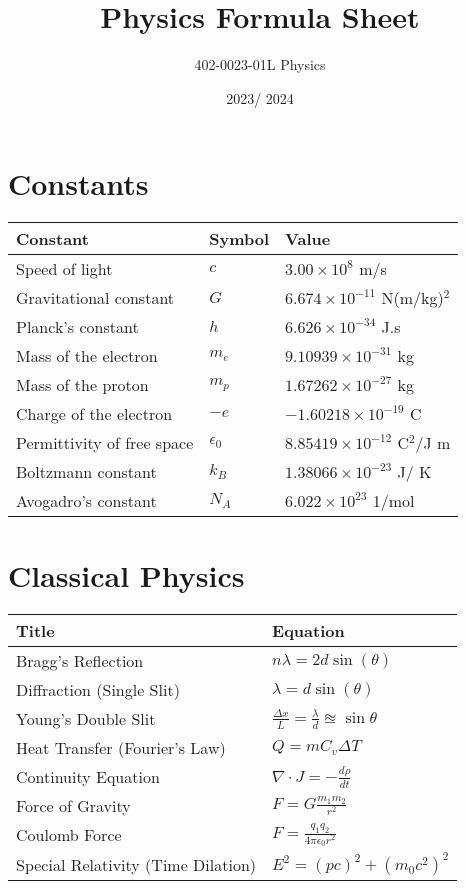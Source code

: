 \documentclass[12pt,a4paper]{article}
\title{Physics Formula Sheet}
\author{402-0023-01L  Physics}
\date{2023/ 2024}
\begin{document}
	\maketitle
	
	\section*{Constants}
	\begin{tabular}{lll}
		\toprule
		Constant & Symbol & Value \\
		\midrule
		Speed of light & \( c \) & \( 3.00 \times 10^8 \) m/s \\
		Gravitational constant & \( G \) & \( 6.674 \times 10^{-11} \) N(m/kg)\(^2\) \\
		Planck's constant & \( h \) & \( 6.626 \times 10^{-34} \) J.s \\
		Mass of the electron & \(m_e\) & \(9.10939 \times 10^{-31}\) kg \\
		Mass of the proton & \(m_p\) & \(1.67262 \times 10^{-27}\) kg \\
		Charge of the electron & \(-e\) & \(-1.60218 \times 10^{-19}\) C \\
		Permittivity of free space & \(\epsilon_0\) & \(8.85419 \times 10^{-12}\) C\(^2\)/J m \\
		Boltzmann constant & \(k_B\) & \(1.38066 \times 10^{-23}\) J/ K \\
		Avogadro's constant & \(N_A \) & \( 6.022 \times 10 ^ {23} \) 1/mol\\
		\bottomrule
	\end{tabular}
	
	\section*{Classical Physics}
\begin{tabular}{ll}
	\toprule
	\textbf{Title} & \textbf{Equation} \\
	\midrule
	Bragg's Reflection & \( n \lambda = 2d \sin(\theta) \) \\
	Diffraction (Single Slit) & \( \lambda = d \sin(\theta) \) \\
	Young's Double Slit & \( \frac{\Delta x}{L} = \frac{ \lambda}{d} \approxeq \sin\theta\) \\
	Heat Transfer (Fourier's Law) & \( Q = mC_v \Delta T \) \\
	Continuity Equation & \( \nabla \cdot J = - \frac{d \rho}{dt} \) \\
	Force of Gravity & \( F = G \frac{m_1 m_2}{r^2} \) \\
	Coulomb Force & \( F =  \frac{q_1 q_2}{4 \pi \epsilon_0 r^2} \) \\
	Special Relativity (Time Dilation) & \( E^2 = (pc)^2 + (m_0 c^2)^2 \) \\
	\bottomrule
\end{tabular}
\end{document}
